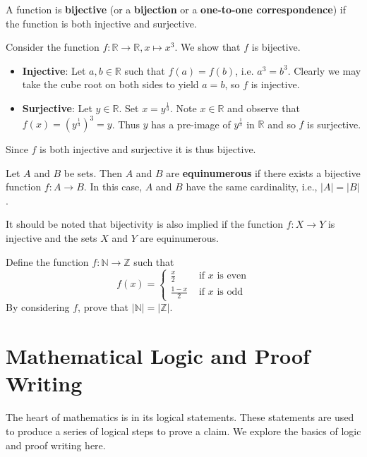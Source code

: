 \begin{definition}
    A function is \textbf{bijective} (or a \textbf{bijection} or a \textbf{one-to-one correspondence}) if the function is both injective and surjective.
\end{definition}
\begin{example}
    Consider the function $f: \mathbb{R} \to \mathbb{R}, x \mapsto x^3$. We show that $f$ is bijective.
    \begin{itemize}
        \item \textbf{Injective}: Let $a, b \in \mathbb{R}$ such that $f(a) = f(b)$, i.e. $a^3 = b^3$. Clearly we may take the cube root on both sides to yield $a = b$, so $f$ is injective.
        \item \textbf{Surjective}: Let $y \in \mathbb{R}$. Set $x=y^{\frac13}$. Note $x \in \mathbb{R}$ and observe that $f(x) = \left(y^{\frac13}\right)^3 = y$. Thus $y$ has a pre-image of $y^{\frac13}$ in $\mathbb{R}$ and so $f$ is surjective.
    \end{itemize}
    Since $f$ is both injective and surjective it is thus bijective.
\end{example}

\begin{definition}
    Let $A$ and $B$ be sets. Then $A$ and $B$ are \textbf{equinumerous} if there exists a bijective function $f: A \to B$. In this case, $A$ and $B$ have the same cardinality, i.e., $|A| = |B|$.
\end{definition}
\begin{remark}
    It should be noted that bijectivity is also implied if the function $f: X \to Y$ is injective and the sets $X$ and $Y$ are equinumerous.
\end{remark}

\begin{exercise}
    Define the function $f: \mathbb{N} \to \mathbb{Z}$ such that
    \[
        f(x) = \begin{cases}
            \frac{x}{2} & \text{ if } x \text{ is even}\\
            \frac{1-x}{2} & \text{ if } x \text{ is odd} 
        \end{cases}
    \]
    By considering $f$, prove that $|\mathbb{N}| = |\mathbb{Z}|$.
\end{exercise}

\chapter{Mathematical Logic and Proof Writing}
The heart of mathematics is in its logical statements. These statements are used to produce a series of logical steps to prove a claim. We explore the basics of logic and proof writing here.

